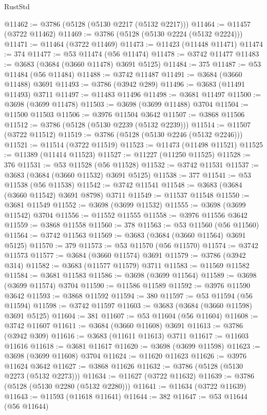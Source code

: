 \begin{lexlean}{RustStd}
\begin{coremodule}
@11462 := @3786 (@5128 (@5130 @2217 (@5132 @2217)))
@11464 := @11457 (@3722 @11462)
@11469 := @3786 (@5128 (@5130 @2224 (@5132 @2224)))
@11471 := @11464 (@3722 @11469)
@11473 := @11423 (@11448 @11471)
@11474 := 374
@11477 := @53 @11474 (@56 @11474)
@11478 := @3742 @11477
@11483 := @3683 (@3684 (@3660 @11478) @3691 @5125)
@11484 := 375
@11487 := @53 @11484 (@56 @11484)
@11488 := @3742 @11487
@11491 := @3684 (@3660 @11488) @3691
@11493 := @3786 (@3942 @289)
@11496 := @3683 (@11491 @11493) @3711
@11497 := @11483 @11496
@11498 := @3681 @11497
@11500 := @3698 (@3699 @11478)
@11503 := @3698 (@3699 @11488) @3704
@11504 := @11500 @11503
@11506 := @3976 @11504 @3642
@11507 := @3868 @11506
@11512 := @3786 (@5128 (@5130 @2239 (@5132 @2239)))
@11514 := @11507 (@3722 @11512)
@11519 := @3786 (@5128 (@5130 @2246 (@5132 @2246)))
@11521 := @11514 (@3722 @11519)
@11523 := @11473 (@11498 @11521)
@11525 := @11389 (@11414 @11523)
@11527 := @11227 (@11250 @11525)
@11528 := 376
@11531 := @53 @11528 (@56 @11528)
@11532 := @3742 @11531
@11537 := @3683 (@3684 (@3660 @11532) @3691 @5125)
@11538 := 377
@11541 := @53 @11538 (@56 @11538)
@11542 := @3742 @11541
@11548 := @3683 (@3684 (@3660 @11542) @3691 @8798) @3711
@11549 := @11537 @11548
@11550 := @3681 @11549
@11552 := @3698 (@3699 @11532)
@11555 := @3698 (@3699 @11542) @3704
@11556 := @11552 @11555
@11558 := @3976 @11556 @3642
@11559 := @3868 @11558
@11560 := 378
@11563 := @53 @11560 (@56 @11560)
@11564 := @3742 @11563
@11569 := @3683 (@3684 (@3660 @11564) @3691 @5125)
@11570 := 379
@11573 := @53 @11570 (@56 @11570)
@11574 := @3742 @11573
@11577 := @3684 (@3660 @11574) @3691
@11579 := @3786 (@3942 @314)
@11582 := @3683 (@11577 @11579) @3711
@11583 := @11569 @11582
@11584 := @3681 @11583
@11586 := @3698 (@3699 @11564)
@11589 := @3698 (@3699 @11574) @3704
@11590 := @11586 @11589
@11592 := @3976 @11590 @3642
@11593 := @3868 @11592
@11594 := 380
@11597 := @53 @11594 (@56 @11594)
@11598 := @3742 @11597
@11603 := @3683 (@3684 (@3660 @11598) @3691 @5125)
@11604 := 381
@11607 := @53 @11604 (@56 @11604)
@11608 := @3742 @11607
@11611 := @3684 (@3660 @11608) @3691
@11613 := @3786 (@3942 @309)
@11616 := @3683 (@11611 @11613) @3711
@11617 := @11603 @11616
@11618 := @3681 @11617
@11620 := @3698 (@3699 @11598)
@11623 := @3698 (@3699 @11608) @3704
@11624 := @11620 @11623
@11626 := @3976 @11624 @3642
@11627 := @3868 @11626
@11632 := @3786 (@5128 (@5130 @2273 (@5132 @2273)))
@11634 := @11627 (@3722 @11632)
@11639 := @3786 (@5128 (@5130 @2280 (@5132 @2280)))
@11641 := @11634 (@3722 @11639)
@11643 := @11593 (@11618 @11641)
@11644 := 382
@11647 := @53 @11644 (@56 @11644)

\end{coremodule}
\end{lexlean}
